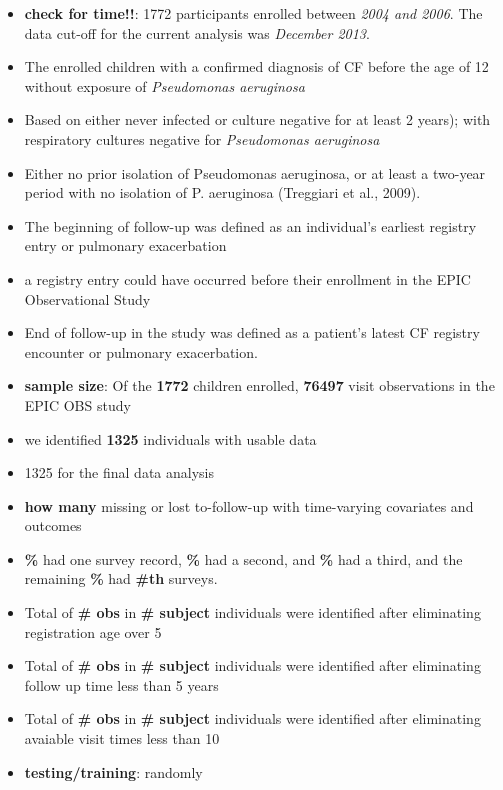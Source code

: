 \documentclass{article}
\begin{document}
\begin{itemize}
\item
  \textbf{check for time!!}: 1772 participants enrolled between
  \emph{2004 and 2006}. The data cut-off for the current analysis was
  \emph{December 2013}.
\item
  The enrolled children with a confirmed diagnosis of CF before the age
  of 12 without exposure of \emph{Pseudomonas aeruginosa}
\item
  Based on either never infected or culture negative for at least 2
  years); with respiratory cultures negative for \emph{Pseudomonas
  aeruginosa}
\item
  Either no prior isolation of Pseudomonas aeruginosa, or at least a
  two-year period with no isolation of P. aeruginosa (Treggiari et al.,
  2009).
\item
  The beginning of follow-up was defined as an individual's earliest
  registry entry or pulmonary exacerbation
\item
  a registry entry could have occurred before their enrollment in the
  EPIC Observational Study
\item
  End of follow-up in the study was defined as a patient's latest CF
  registry encounter or pulmonary exacerbation.
\item
  \textbf{sample size}: Of the \textbf{1772} children enrolled,
  \textbf{76497} visit observations in the EPIC OBS study
\item
  we identified \textbf{1325} individuals with usable data
\item
  1325 for the final data analysis
\item
  \textbf{how many} missing or lost to-follow-up with time-varying
  covariates and outcomes
\item
  \textbf{\%} had one survey record, \textbf{\%} had a second, and
  \textbf{\%} had a third, and the remaining \textbf{\%} had
  \textbf{\#th} surveys.
\item
  Total of \textbf{\# obs} in \textbf{\# subject} individuals were
  identified after eliminating registration age over 5
\item
  Total of \textbf{\# obs} in \textbf{\# subject} individuals were
  identified after eliminating follow up time less than 5 years
\item
  Total of \textbf{\# obs} in \textbf{\# subject} individuals were
  identified after eliminating avaiable visit times less than 10
\item
  \textbf{testing/training}: randomly
\end{itemize}
\end{document}
